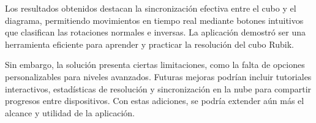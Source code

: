                                                                                                                                                                                                                                                                                                                                                                                                                                                                                                                                                                                                                                                                                                                                                                                                                                                                                                                                                                                                                                                                                                                                                                                                                                                                                                                                                                                                                                                                                                                                                                                                                                                                                                                                                                                                                                                                                                                                                                                                                                                                                                                                                                                                                                                                                                                                                                                                                                                                                                                                                                                                                                                                                                                                                                                                                                                                                                                                                                                                                                                                                                                                                                                                                                                                                                                                                                                                                                                                                                                                                                                                                                                                                                                                                                                                                                                                                                                                                                                                                                                                                                                                                                                                                                                                                                                                                                                                                                                                                                                                                                                                                                                                                                                                                                                                                                                                                                                                                                                                                                                                                                                                                                                                                                                                                                                                                                                                                                                                                                                                                                                                                                                                                                                                                                                                                                                                                                                                                                                                                                                                                                                                                                                                                                                                                                                                                                                                                                                                                                                                                                                                                                                                                                                                                                                                                                                                                                                                                                                                                                                                                                                                                                                                                                                                                                                                                                                                                                                                                                                                                                                                                                                                                                                                                                                                                                                                                                                                                                                                                                                                                                                                                                                                                                                                                                                                                                                                                                                                                                                                                                                                                                                                                                                                                                                                                                                                                                                                                                                                                                                                                                                                                                                                                                                                                                                                                                                                                                                                                                                                                                                                                                                                                                                                                                                                                                                                                                                                                                                                                                                                                                                                                                                                                                                                                                                                                                                                                                                                                                                                                                                                                                                                                                                                                                                                                                                                                                                                                                                                                                                                                                                                                                                                                                                                                                                                                                                                                                                                                                                                                                                                                                                                                                                                                                                                                                                                                                                                                                                                                                                                                                                                                                                                                                                                                                                                                                                                                                                                                                                                                                                                                                                                                                                                                                                                                                                                                                                                                                                                                                                                                                                                                                                                                                                                                                                                                                                                                                                                                                                                                                                                                                                                                                                                                                                                                                                                                                                                                                                                                                                                                                                                                                                                                                                                                                                                                                                                                                                                                                                                                                                                                                                                                                                                                                                                                                                                                                                                                                                                                                                                                                                                                                                                                                                                                                                                                                                                                                                                                                                                                                                                                                                                                                                                                                                                                                                                                                                                                                                                                                                                                                                                                                                                                                                                                                                                                                                                                                                                                                                                                                                                                                                                                                                                                                                                                                                                                                                                                                                                                                                                                                                                                                                                                                                                                                                                                                                                                                                                                                                                                                                                                                                                                                                                                                                                                                                                                                                                                                                                                                                                                                                                                                                                                                                                                                                                                                                                                                                                                                                                                                                                                                                                                                                                                                                                                                                                                                                                                                                                                                                                                                                                                                                                                                                                                                                                                                                                                                                                                                                                                                                                                                                                                                                                                                                                                                                                                                                                                                                                                                                                                                                                                                                                                                                                                                                                                                                                                                                                                                                                                                                                                                                                                                                                                                                                                                                                                                                                                                                                                                                                                                                                                                                                                                                                                                                                                                                                                                                                                                                                                                                                                                                                                                                                                                                                                                                                                                                                                                                                                                                                                                                                                                                                                                                                                                                                                                                                                                                                                                                                                                                                                                                                                                                                                                                                                                                                                                                                                                                                                                                                                                                                                                                                                                                                                                                                                                                                                                                                                                                                                                                                                                                                                                                                                                                                                                                                                                                                                                                                                                                                                                                                                                                                                                                                                                                                                                                                                                                                                                                                                                                                                                                                                                                                                                                                                                                                                                                                                                                                                                                                                                                                                                                                                                                                                                                                                                                                                                                                                                                                                                                                                                                                                                                                                                                                                                                                                                                                                                                                                                                                                                                                                                                                                                                                                                                                                                                                                                                                                                                                                                                                                                                                                                                                                                                                                                                                                                                                                                                                                                                                                                                                                                                                                                                                                                                                                                                                                                                                                                                                                                                                                                                                                                                                                                                                                                                                                                                                                                                                                                                                                                                                                                                                                                                                                                                                                                                                                                                                                                                                                                                                                                                                                                                                                                                                                                                                                                                                                                                                                                                                                                                                                                                                                                                                                                                                                                                                                                                                                                                                                                                                                                                                                                                                                                                                                                                                                                                                                                                                                                                                                                                                                                                                                                                                                                                                                                                                                                                                                                                                                                                                                                                                                                                                                                                                                                                                                                                                                                                                                                                                                                                                                                                                                                                                                                                                                                                                                                                                                                                                                                                                                                                                                                                                                                                                                                                                                                                                                                                                                                                                                                                                                                                                                                                                                                                                                                                                                                                                                                                                                                                                                                                                                                                                                                                                                                                                                                                                                                                                                                                                                                                                                                                                                                                                                                                                                                                                                                                                                                                                                                                                                                                                                                                                                                                                                                                                                                                                                                                                                                                                                                                                                                                                                                                                                                                                                                                                                                                                                                                                                                                                                                                                                                                                                                                                                                                                                                                                                                                                                                                                                                                                                                                                                                                                                                                                                                                                                                                                                                                                                                                                                                                                                                                                                                                                                                                                                                                                                                                                                                                                                                                                                                                                                                                                                                                                                                                                                                                                                                                                                                                                                                                                                                                                                                                                                                                                                                                                                                                                                                                                                                                                                                                                                                                                                                                                                                                                                                                                                                                                                                                                                                                                                                                                                                                                                                                                                                                                                                                                                                                                                                                                                                                                                                                                                                                                                                                                                                                                                                                                                                                                                                                                                                                                                                                                                                                                                                                                                                                                                                                                                                                                                                                                                                                                                                                                                                                                                                                                                                                                                                                                                                                                                                                                                                                                                                                                                                                                                                                                                                                                                                                                                                                                                                                                                                                                                                                                                                                                                                                                                                                                                                                                                                                                                                                                                                                                                                                                                                                                                                                                                                                                                                                                                                                                                                                                                                                                                                                                                                                                                                                                                                                                                                                                                                                                                                                                                                                                                                                                                                                                                                                                                                                                                                                                                                                                                                                                                                                                                                                                                                                                                                                                                                                                                                                                                                                                                                                                                                                                                                                                                                                                                                                                                                                                                                                                                                                                                                                                                                                                                                                                                                                                                                                                                                                                                                                                                                                                                                                                                                                                                                                                                                                                                                                                                                                                                                                                                                                                                                                                                                                                                                                                                                                                                                                                                                                                                                                                                                                                                                                                                                                                                                                                                                                                                                                                                                                                                                                                                                                                                                                                                                                                                                                                                                                                                                                                                                                                                                                                                                                                                                                                                                                                                                                                                                                                                                                                                                                                                                                                                                                                                                                                                                                                                                                                                                                                                                                                                                                \documentclass[conference]{IEEEtran}
\begin{document}
Los resultados obtenidos destacan la sincronización efectiva entre el cubo y el diagrama, permitiendo movimientos en tiempo real mediante botones intuitivos que clasifican las rotaciones normales e inversas. La aplicación demostró ser una herramienta eficiente para aprender y practicar la resolución del cubo Rubik.

Sin embargo, la solución presenta ciertas limitaciones, como la falta de opciones personalizables para niveles avanzados. Futuras mejoras podrían incluir tutoriales interactivos, estadísticas de resolución y sincronización en la nube para compartir progresos entre dispositivos. Con estas adiciones, se podría extender aún más el alcance y utilidad de la aplicación.

\printbibliography
\end{document}
